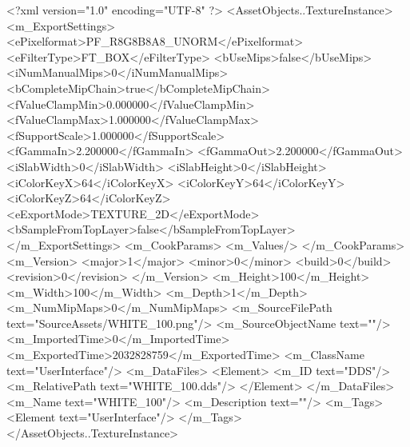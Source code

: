 <?xml version="1.0" encoding="UTF-8" ?>
<AssetObjects..TextureInstance>
	<m_ExportSettings>
		<ePixelformat>PF_R8G8B8A8_UNORM</ePixelformat>
		<eFilterType>FT_BOX</eFilterType>
		<bUseMips>false</bUseMips>
		<iNumManualMips>0</iNumManualMips>
		<bCompleteMipChain>true</bCompleteMipChain>
		<fValueClampMin>0.000000</fValueClampMin>
		<fValueClampMax>1.000000</fValueClampMax>
		<fSupportScale>1.000000</fSupportScale>
		<fGammaIn>2.200000</fGammaIn>
		<fGammaOut>2.200000</fGammaOut>
		<iSlabWidth>0</iSlabWidth>
		<iSlabHeight>0</iSlabHeight>
		<iColorKeyX>64</iColorKeyX>
		<iColorKeyY>64</iColorKeyY>
		<iColorKeyZ>64</iColorKeyZ>
		<eExportMode>TEXTURE_2D</eExportMode>
		<bSampleFromTopLayer>false</bSampleFromTopLayer>
	</m_ExportSettings>
	<m_CookParams>
		<m_Values/>
	</m_CookParams>
	<m_Version>
		<major>1</major>
		<minor>0</minor>
		<build>0</build>
		<revision>0</revision>
	</m_Version>
	<m_Height>100</m_Height>
	<m_Width>100</m_Width>
	<m_Depth>1</m_Depth>
	<m_NumMipMaps>0</m_NumMipMaps>
	<m_SourceFilePath text="SourceAssets/WHITE_100.png"/>
	<m_SourceObjectName text=""/>
	<m_ImportedTime>0</m_ImportedTime>
	<m_ExportedTime>2032828759</m_ExportedTime>
	<m_ClassName text="UserInterface"/>
	<m_DataFiles>
		<Element>
			<m_ID text="DDS"/>
			<m_RelativePath text="WHITE_100.dds"/>
		</Element>
	</m_DataFiles>
	<m_Name text="WHITE_100"/>
	<m_Description text=""/>
	<m_Tags>
		<Element text="UserInterface"/>
	</m_Tags>
</AssetObjects..TextureInstance>

